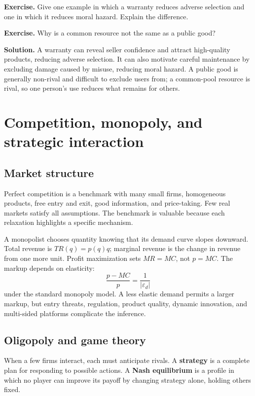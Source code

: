 \documentclass[11pt,oneside,openany]{book}
\newcommand{\term}[1]{\textbf{#1}\index{#1}}
\newcommand{\exercise}[1]{\textbf{Exercise.} #1}
\newcommand{\solution}[1]{\textbf{Solution.} #1}
\begin{document}
\exercise{Give one example in which a warranty reduces adverse selection and one in which it reduces moral hazard. Explain the difference.}

\exercise{Why is a common resource not the same as a public good?}

\solution{A warranty can reveal seller confidence and attract high-quality products, reducing adverse selection. It can also motivate careful maintenance by excluding damage caused by misuse, reducing moral hazard. A public good is generally non-rival and difficult to exclude users from; a common-pool resource is rival, so one person's use reduces what remains for others.}

\chapter{Competition, monopoly, and strategic interaction}
\label{ch:competition}

\section{Market structure}

Perfect competition is a benchmark with many small firms, homogeneous products, free entry and exit, good information, and price-taking. Few real markets satisfy all assumptions. The benchmark is valuable because each relaxation highlights a specific mechanism.

A monopolist chooses quantity knowing that its demand curve slopes downward. Total revenue is $TR(q)=p(q)q$; marginal revenue is the change in revenue from one more unit. Profit maximization sets $MR=MC$, not $p=MC$. The markup depends on elasticity:
\[
  \frac{p-MC}{p}=\frac{1}{|\varepsilon_d|}
\]
under the standard monopoly model. A less elastic demand permits a larger markup, but entry threats, regulation, product quality, dynamic innovation, and multi-sided platforms complicate the inference.

\section{Oligopoly and game theory}

When a few firms interact, each must anticipate rivals. A \term{strategy} is a complete plan for responding to possible actions. A \term{Nash equilibrium} is a profile in which no player can improve its payoff by changing strategy alone, holding others fixed.
\end{document}
